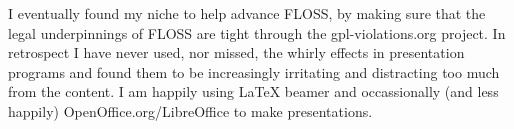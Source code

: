 I eventually found my niche to help advance FLOSS, by making sure that the legal underpinnings of FLOSS are tight through the gpl-violations.org project. In retrospect I have never used, nor missed, the whirly effects in presentation programs and found them to be increasingly irritating and distracting too much from the content. I am happily using LaTeX beamer and occassionally (and less happily) OpenOffice.org/LibreOffice to make presentations.
